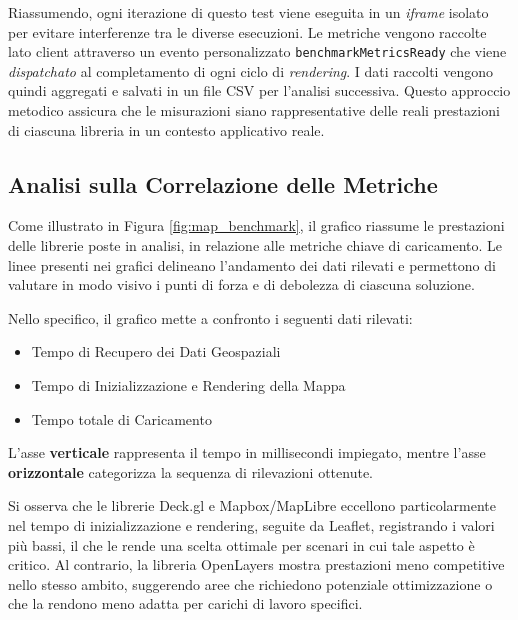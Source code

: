 \noindent
Riassumendo, ogni iterazione di questo test viene eseguita in un \textit{iframe}
isolato per evitare interferenze tra le diverse esecuzioni. Le metriche vengono raccolte
lato client attraverso un evento personalizzato \texttt{benchmarkMetricsReady}
che viene \textit{dispatchato} al completamento di ogni ciclo di \textit{rendering}.
I dati raccolti vengono quindi aggregati e salvati in un file CSV per l'analisi successiva.
Questo approccio metodico assicura che le misurazioni siano rappresentative
delle reali prestazioni di ciascuna libreria in un contesto applicativo reale.

\subsection{Analisi sulla Correlazione delle Metriche}


Come illustrato in Figura \ref{fig:map_benchmark}, il grafico riassume le
prestazioni delle librerie poste in analisi, in relazione alle metriche chiave di
caricamento. Le linee presenti nei grafici delineano l'andamento dei dati
rilevati e permettono di valutare in modo visivo i punti di forza e di debolezza
di ciascuna soluzione.

Nello specifico, il grafico mette a confronto i seguenti dati rilevati:
\begin{itemize}
  \item Tempo di Recupero dei Dati Geospaziali

  \item Tempo di Inizializzazione e Rendering della Mappa

  \item Tempo totale di Caricamento
\end{itemize}

\noindent
L'asse \textbf{verticale} rappresenta il tempo in millisecondi impiegato, mentre
l'asse \textbf{orizzontale} categorizza la sequenza di rilevazioni ottenute.

Si osserva che le librerie Deck.gl e Mapbox/MapLibre eccellono particolarmente
nel tempo di inizializzazione e rendering, seguite da Leaflet, registrando i
valori più bassi, il che le rende una scelta ottimale per scenari in cui tale aspetto
è critico. Al contrario, la libreria OpenLayers mostra prestazioni meno competitive
nello stesso ambito, suggerendo aree che richiedono potenziale ottimizzazione o
che la rendono meno adatta per carichi di lavoro specifici.

